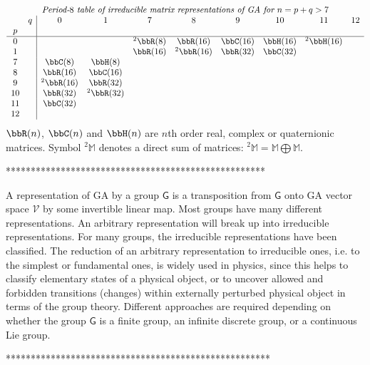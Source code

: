 $$
\begin{array}{cc|cccccccc}
\multicolumn{10}{c}{\textit{Period-$8$ table of irreducible
matrix representations of GA for $n=p+q>7$}}\\
 &q&0&1&7&8&9&10&11&12\\
 p& &&&&&&&&\\ \hline
 0&
  & & &^2\bbR(8)&\bbR(16)&\bbC(16)&\bbH(16)&^2\bbH(16)& \\
 1& & & &\bbR(16)&^2\bbR(16)&\bbR(32)&\bbC(32)& & \\
 7& &\bbC(8)&\bbH(8)& & & & & & \\
 8& &\bbR(16)&\bbC(16)& & & & & & \\
 9& &^2\bbR(16)&\bbR(32)& & & & & & \\
 10& &\bbR(32)&^2\bbR(32)& & & & & & \\
 11& &\bbC(32)& & & & & & & \\
 12& & & & & & & & &
\end{array}
$$
%
$\bbR(n)$, $\bbC(n)$ and $\bbH(n)$ are $n$th
order real, complex or quaternionic matrices. Symbol
$^2\mathbb{M}$ denotes a direct sum of matrices:
$^2\mathbb{M}=\mathbb{M}\bigoplus\mathbb{M}$.






****************************************************

A representation of GA by a group $\mathsf{G}$ is a transposition
from $\mathsf{G}$ onto GA vector space $\mathcal{V}$ by some
invertible linear map. Most groups have many different
representations. An arbitrary representation will break up into
irreducible representations. For many groups, the irreducible
representations have been classified. The reduction of an
arbitrary representation to irreducible ones, i.e. to the simplest
or fundamental ones, is widely used in physics, since this helps
to classify elementary states of a physical object, or to uncover
allowed and forbidden transitions (changes) within externally
perturbed physical object in terms of the group theory. Different
approaches are required depending on whether the group
$\mathsf{G}$ is a finite group, an infinite discrete group, or a
continuous Lie group.

*****************************************************

